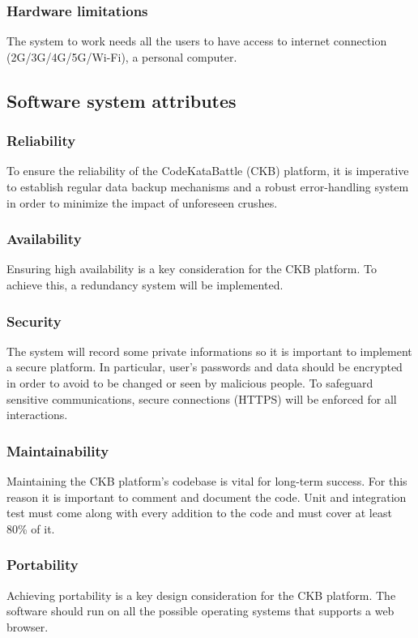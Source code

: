\documentclass{article}
\begin{document}
        \subsubsection{Hardware limitations}
            The system to work needs all the users to have access to internet connection (2G/3G/4G/5G/Wi-Fi), a personal computer.
            
    \subsection{Software system attributes}
        \subsubsection{Reliability}
        To ensure the reliability of the CodeKataBattle (CKB) platform, it is imperative to establish regular data backup mechanisms and a robust error-handling system in order to minimize the impact of unforeseen crushes.
        \subsubsection{Availability}
        Ensuring high availability is a key consideration for the CKB platform. To achieve this, a redundancy system will be implemented. 
        \subsubsection{Security}
        The system will record some private informations so it is important to implement a secure platform. In particular, user's passwords and data should be encrypted in order to avoid to be changed or seen by malicious people.
        To safeguard sensitive communications, secure connections (HTTPS) will be enforced for all interactions.
        \subsubsection{Maintainability}
        Maintaining the CKB platform's codebase is vital for long-term success. For this reason it is important to comment and document the code. Unit and integration test must come along with every addition to the code and must cover at least 80\% of it. 
        \subsubsection{Portability}
        Achieving portability is a key design consideration for the CKB platform. The software should run on all the possible operating systems that supports a web browser.
\end{document}
